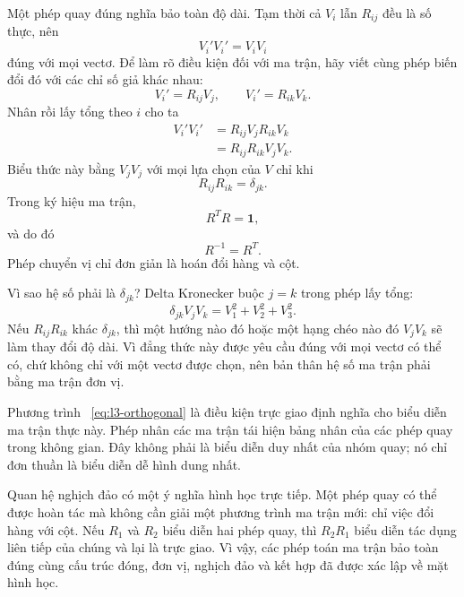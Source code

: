 Một phép quay đúng nghĩa bảo toàn độ dài. Tạm thời cả \(V_i\) lẫn \(R_{ij}\) đều là số thực, nên
\begin{equation}
V_i'V_i'=V_iV_i
\end{equation}
đúng với mọi vectơ. Để làm rõ điều kiện đối với ma trận, hãy viết cùng phép biến đổi đó với các chỉ số giả khác nhau:
\begin{equation}
V_i'=R_{ij}V_j,\qquad V_i'=R_{ik}V_k.
\end{equation}
Nhân rồi lấy tổng theo \(i\) cho ta
\begin{align}
V_i'V_i'
 &=R_{ij}V_jR_{ik}V_k\\
 &=R_{ij}R_{ik}V_jV_k.
\end{align}
Biểu thức này bằng \(V_jV_j\) với mọi lựa chọn của \(V\) chỉ khi
\begin{equation}
R_{ij}R_{ik}=\delta_{jk}.
\label{eq:l3-orthogonality-index}
\end{equation}
Trong ký hiệu ma trận,
\begin{equation}
R^TR=\boldsymbol 1,
\label{eq:l3-orthogonal}
\end{equation}
và do đó
\begin{equation}
R^{-1}=R^T.
\end{equation}
Phép chuyển vị chỉ đơn giản là hoán đổi hàng và cột.

Vì sao hệ số phải là \(\delta_{jk}\)? Delta Kronecker buộc \(j=k\) trong phép lấy tổng:
\begin{equation}
\delta_{jk}V_jV_k=V_1^2+V_2^2+V_3^2.
\end{equation}
Nếu \(R_{ij}R_{ik}\) khác \(\delta_{jk}\), thì một hướng nào đó hoặc một hạng chéo nào đó \(V_jV_k\) sẽ làm thay đổi độ dài. Vì đẳng thức này được yêu cầu đúng với mọi vectơ có thể có, chứ không chỉ với một vectơ được chọn, nên bản thân hệ số ma trận phải bằng ma trận đơn vị.

Phương trình ~\eqref{eq:l3-orthogonal} là điều kiện trực giao định nghĩa cho biểu diễn ma trận thực này. Phép nhân các ma trận tái hiện bảng nhân của các phép quay trong không gian. Đây không phải là biểu diễn duy nhất của nhóm quay; nó chỉ đơn thuần là biểu diễn dễ hình dung nhất.

Quan hệ nghịch đảo có một ý nghĩa hình học trực tiếp. Một phép quay có thể được hoàn tác mà không cần giải một phương trình ma trận mới: chỉ việc đổi hàng với cột. Nếu \(R_1\) và \(R_2\) biểu diễn hai phép quay, thì \(R_2R_1\) biểu diễn tác dụng liên tiếp của chúng và lại là trực giao. Vì vậy, các phép toán ma trận bảo toàn đúng cùng cấu trúc đóng, đơn vị, nghịch đảo và kết hợp đã được xác lập về mặt hình học.


